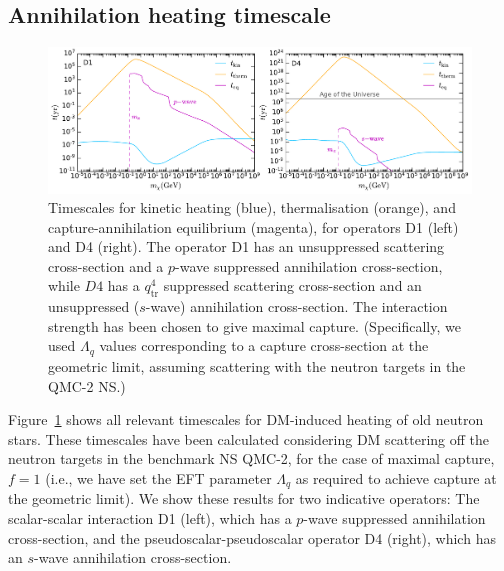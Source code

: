 \subsection{Annihilation heating timescale}
\label{ch6:subsec:AnnHeatTimes}



\begin{figure}[t!bp]
\centering    
\includegraphics[width=\textwidth]{timescales_maxcap_n.pdf}
    \caption[Timescales for kinetic heating (blue), thermalisation (orange), and capture-annihilation equilibrium (magenta), for operators D1 (left) and D4 (right). ]{Timescales for kinetic heating (blue), thermalisation (orange), and capture-annihilation equilibrium (magenta), for operators D1 (left) and D4 (right). The operator D1 has an unsuppressed scattering cross-section and a $p$-wave suppressed annihilation cross-section, while $D4$ has a $q_\text{tr}^4$ suppressed scattering cross-section and an unsuppressed ($s$-wave) annihilation cross-section.
    The interaction strength has been chosen to give maximal capture. (Specifically, we used $\Lambda_q$ values corresponding to a capture cross-section at the geometric limit, assuming scattering with the neutron targets in the QMC-2 NS.)   
    }
    \label{ch6:fig:timescales}
\end{figure}



Figure~\ref{ch6:fig:timescales} shows all relevant timescales for DM-induced heating of old neutron stars. These timescales have been calculated considering DM scattering off the neutron targets in the benchmark NS QMC-2, for the case of maximal capture, $f = 1$ (i.e., we have set the EFT parameter $\Lambda_q$ as required to achieve capture at the geometric limit).
We show these results for two indicative operators: The scalar-scalar interaction D1 (left), which has a $p$-wave suppressed annihilation cross-section, and the pseudoscalar-pseudoscalar operator D4 (right), which has an $s$-wave annihilation cross-section. 

